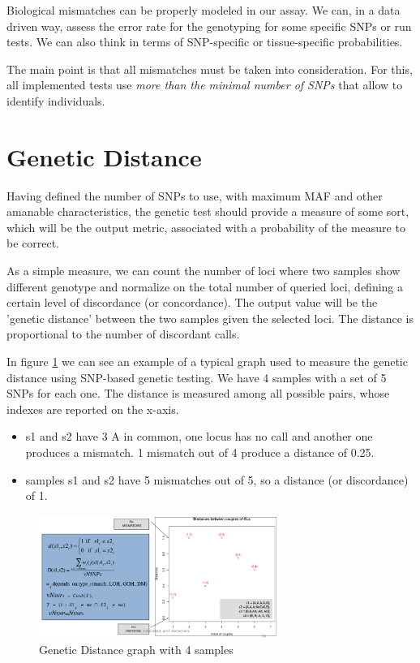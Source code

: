 \bigskip
Biological mismatches can be properly modeled in our assay. We can, in a data driven way, assess the error rate for the genotyping for some specific SNPs or run tests. We can also think in terms of SNP-specific or tissue-specific probabilities.

The main point is that all mismatches must be taken into consideration. 
For this, all implemented tests use \emph{more than the minimal number of SNPs} that allow to identify individuals. 


\section*{Genetic Distance}

Having defined the number of SNPs to use, with maximum MAF and other amanable characteristics, the genetic test should provide a measure of some sort, which will be the output metric, associated with a probability of the measure to be correct. 

As a simple measure, we can count the number of loci where two samples show different genotype and normalize on the total number of queried loci, defining a certain level of discordance (or concordance). The output value will be the 'genetic distance' between the two samples given the selected loci. The distance is proportional to the number of discordant calls.

In figure \ref{fig:Distance} we can see an example of a typical graph used to measure the genetic distance using SNP-based genetic testing. We have 4 samples with a set of 5 SNPs for each one. The distance is measured among all possible pairs, whose indexes are reported on the x-axis. 
\begin{itemize}
	\item s1 and s2 have 3 A in common, one locus has no call and another one produces a mismatch. 1 mismatch out of 4 produce a distance of 0.25.
	\item samples s1 and s2 have 5 mismatches out of 5, so a distance (or discordance) of 1. 
\end{itemize}

\begin{figure}
	\centering
	\includegraphics[width=0.7\textwidth]{loci.PNG}
	\caption{\label{fig:Distance}Genetic Distance graph with 4 samples}
\end{figure}

